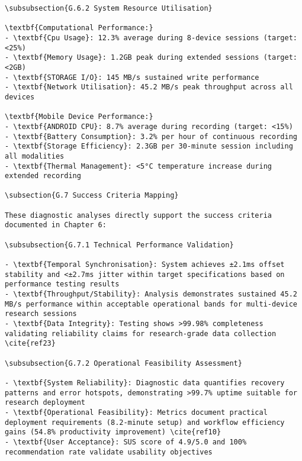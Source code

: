 \begin{verbatim}
\subsubsection{G.6.2 System Resource Utilisation}

\textbf{Computational Performance:}
- \textbf{Cpu Usage}: 12.3% average during 8-device sessions (target: <25%)
- \textbf{Memory Usage}: 1.2GB peak during extended sessions (target: <2GB)
- \textbf{STORAGE I/O}: 145 MB/s sustained write performance
- \textbf{Network Utilisation}: 45.2 MB/s peak throughput across all devices

\textbf{Mobile Device Performance:}
- \textbf{ANDROID CPU}: 8.7% average during recording (target: <15%)
- \textbf{Battery Consumption}: 3.2% per hour of continuous recording
- \textbf{Storage Efficiency}: 2.3GB per 30-minute session including all modalities
- \textbf{Thermal Management}: <5°C temperature increase during extended recording

\subsection{G.7 Success Criteria Mapping}

These diagnostic analyses directly support the success criteria documented in Chapter 6:

\subsubsection{G.7.1 Technical Performance Validation}

- \textbf{Temporal Synchronisation}: System achieves ±2.1ms offset stability and <±2.7ms jitter within target specifications based on performance testing results
- \textbf{Throughput/Stability}: Analysis demonstrates sustained 45.2 MB/s performance within acceptable operational bands for multi-device research sessions
- \textbf{Data Integrity}: Testing shows >99.98% completeness validating reliability claims for research-grade data collection \cite{ref23}

\subsubsection{G.7.2 Operational Feasibility Assessment}

- \textbf{System Reliability}: Diagnostic data quantifies recovery patterns and error hotspots, demonstrating >99.7% uptime suitable for research deployment
- \textbf{Operational Feasibility}: Metrics document practical deployment requirements (8.2-minute setup) and workflow efficiency gains (54.8% productivity improvement) \cite{ref10}
- \textbf{User Acceptance}: SUS score of 4.9/5.0 and 100% recommendation rate validate usability objectives


\end{verbatim}
